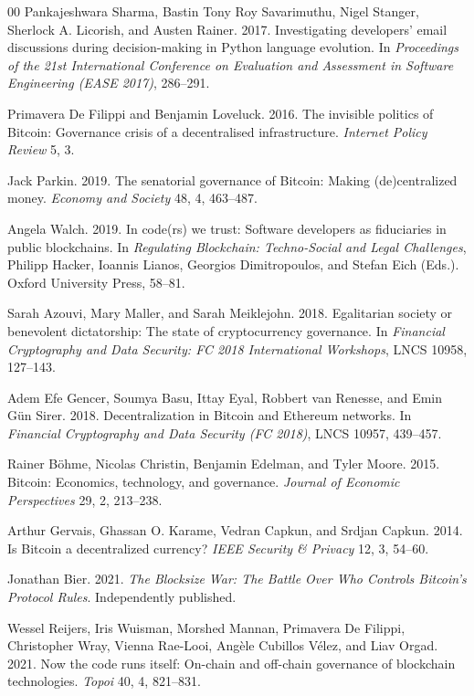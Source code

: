 \documentclass[sigconf,screen]{acmart}
\begin{document}
\begin{thebibliography}{00}
Pankajeshwara Sharma, Bastin Tony Roy Savarimuthu, Nigel Stanger, Sherlock A. Licorish, and Austen Rainer. 2017. Investigating developers' email discussions during decision-making in Python language evolution. In \emph{Proceedings of the 21st International Conference on Evaluation and Assessment in Software Engineering (EASE 2017)}, 286--291.

Primavera De Filippi and Benjamin Loveluck. 2016. The invisible politics of Bitcoin: Governance crisis of a decentralised infrastructure. \emph{Internet Policy Review} 5, 3.

Jack Parkin. 2019. The senatorial governance of Bitcoin: Making (de)centralized money. \emph{Economy and Society} 48, 4, 463--487.

Angela Walch. 2019. In code(rs) we trust: Software developers as fiduciaries in public blockchains. In \emph{Regulating Blockchain: Techno-Social and Legal Challenges}, Philipp Hacker, Ioannis Lianos, Georgios Dimitropoulos, and Stefan Eich (Eds.). Oxford University Press, 58--81.

Sarah Azouvi, Mary Maller, and Sarah Meiklejohn. 2018. Egalitarian society or benevolent dictatorship: The state of cryptocurrency governance. In \emph{Financial Cryptography and Data Security: FC 2018 International Workshops}, LNCS 10958, 127--143.

Adem Efe Gencer, Soumya Basu, Ittay Eyal, Robbert van Renesse, and Emin G\"un Sirer. 2018. Decentralization in Bitcoin and Ethereum networks. In \emph{Financial Cryptography and Data Security (FC 2018)}, LNCS 10957, 439--457.

Rainer B\"ohme, Nicolas Christin, Benjamin Edelman, and Tyler Moore. 2015. Bitcoin: Economics, technology, and governance. \emph{Journal of Economic Perspectives} 29, 2, 213--238.

Arthur Gervais, Ghassan O. Karame, Vedran Capkun, and Srdjan Capkun. 2014. Is Bitcoin a decentralized currency? \emph{IEEE Security \& Privacy} 12, 3, 54--60.

Jonathan Bier. 2021. \emph{The Blocksize War: The Battle Over Who Controls Bitcoin's Protocol Rules}. Independently published.

Wessel Reijers, Iris Wuisman, Morshed Mannan, Primavera De Filippi, Christopher Wray, Vienna Rae-Looi, Ang\`ele Cubillos V\'elez, and Liav Orgad. 2021. Now the code runs itself: On-chain and off-chain governance of blockchain technologies. \emph{Topoi} 40, 4, 821--831.


\end{thebibliography}
\end{document}
